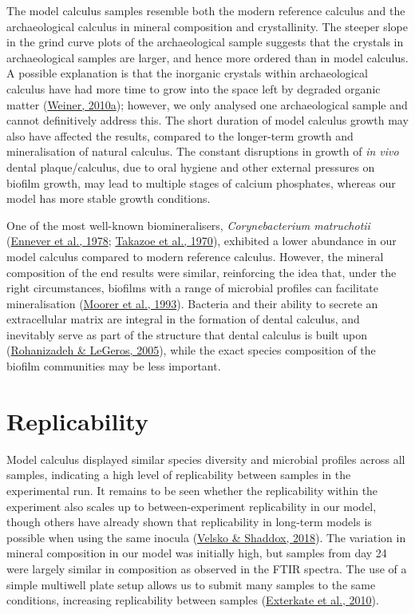 \documentclass[
  letterpaper,
]{book}
\begin{document}
The model calculus samples resemble both the modern reference calculus
and the archaeological calculus in mineral composition and
crystallinity. The steeper slope in the grind curve plots of the
archaeological sample suggests that the crystals in archaeological
samples are larger, and hence more ordered than in model calculus. A
possible explanation is that the inorganic crystals within
archaeological calculus have had more time to grow into the space left
by degraded organic matter
(\protect\hyperlink{ref-weinerBiologicalMaterials2010}{Weiner, 2010a});
however, we only analysed one archaeological sample and cannot
definitively address this. The short duration of model calculus growth
may also have affected the results, compared to the longer-term growth
and mineralisation of natural calculus. The constant disruptions in
growth of \emph{in vivo} dental plaque/calculus, due to oral hygiene and
other external pressures on biofilm growth, may lead to multiple stages
of calcium phosphates, whereas our model has more stable growth
conditions.

One of the most well-known biomineralisers, \emph{Corynebacterium
matruchotii}
(\protect\hyperlink{ref-enneverCharacterizationBacterionema1978}{Ennever
et al., 1978};
\protect\hyperlink{ref-takazoeCalciumHydroxyapatite1970}{Takazoe et al.,
1970}), exhibited a lower abundance in our model calculus compared to
modern reference calculus. However, the mineral composition of the end
results were similar, reinforcing the idea that, under the right
circumstances, biofilms with a range of microbial profiles can
facilitate mineralisation
(\protect\hyperlink{ref-moorerCalcificationCariogenic1993}{Moorer et
al., 1993}). Bacteria and their ability to secrete an extracellular
matrix are integral in the formation of dental calculus, and inevitably
serve as part of the structure that dental calculus is built upon
(\protect\hyperlink{ref-rohanizadehUltrastructuralStudy2005}{Rohanizadeh
\& LeGeros, 2005}), while the exact species composition of the biofilm
communities may be less important.

\hypertarget{replicability}{%
\section{Replicability}\label{replicability}}

Model calculus displayed similar species diversity and microbial
profiles across all samples, indicating a high level of replicability
between samples in the experimental run. It remains to be seen whether
the replicability within the experiment also scales up to
between-experiment replicability in our model, though others have
already shown that replicability in long-term models is possible when
using the same inocula
(\protect\hyperlink{ref-velskoConsistentReproducible2018}{Velsko \&
Shaddox, 2018}). The variation in mineral composition in our model was
initially high, but samples from day 24 were largely similar in
composition as observed in the FTIR spectra. The use of a simple
multiwell plate setup allows us to submit many samples to the same
conditions, increasing replicability between samples
(\protect\hyperlink{ref-extercateAAA2010}{Exterkate et al., 2010}).
\end{document}
